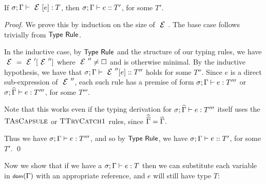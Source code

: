\SS\begin{Corollary}\ \\
	\indent If $\ty{\E[e]}T$, then $\tye{e}{T'}$, for some $T'$.
\end{Corollary}
\SS\begin{proof}
	We prove this by induction on the size of $\E$.
	The base case follows trivially from $\textsf{Type Rule}$.

	In the inductive case, by $\textsf{Type Rule}$ and the structure of our typing rules, we have $\E = \E'[\E'']$ where $\E'' \neq \hole$ and is otherwise minimal.
	By the inductive hypothesis, we have that $\tye{\E''[e]}{T''}$ holds for some $T''$.
	Since $e$ is a direct sub-expression of $\E''$, each such rule has a premise of form $\ty e{T'''}$ or $\ty[\s][\demut{\G}]e{T'''}$, for some $T'''$.
	
	Note that this works even if the typing derivation for $\ty[\s][\demut{\G}]e{T'''}$ itself uses the $\textsc{TAsCapsule}$ or $\textsc{TTryCatch1}$ rules, since $\widehat{\widehat{\Gamma}} = \widehat{\Gamma}$.
	
	Thus we have $\ty e{T'''}$, and so by $\textsf{Type Rule}$, we have $\tye e{T'}$, for some $T'$.
\qed\end{proof}

Now we show that if we have a $\ty eT$ then we can substitute each variable in $\dom(\G)$ with an appropriate reference, and $e$ will still have type $T$:

